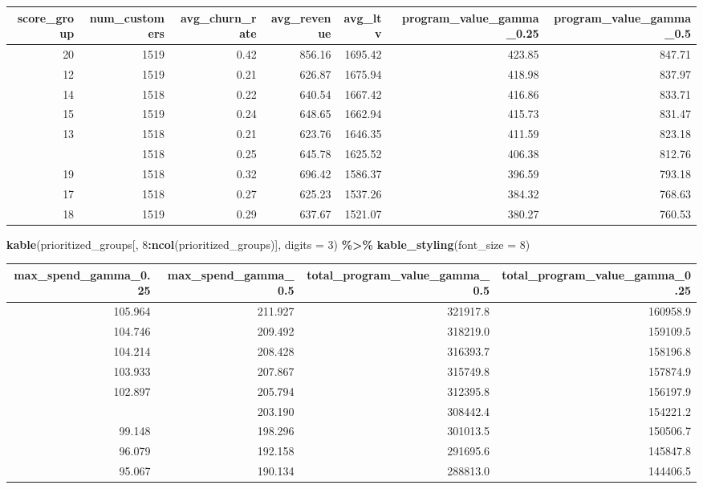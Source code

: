 \documentclass[
]{article}
\newenvironment{Shaded}{\begin{snugshade}}{\end{snugshade}}
\newcommand{\AttributeTok}[1]{\textcolor[rgb]{0.13,0.29,0.53}{#1}}
\newcommand{\DecValTok}[1]{\textcolor[rgb]{0.00,0.00,0.81}{#1}}
\newcommand{\FunctionTok}[1]{\textcolor[rgb]{0.13,0.29,0.53}{\textbf{#1}}}
\newcommand{\NormalTok}[1]{#1}
\newcommand{\SpecialCharTok}[1]{\textcolor[rgb]{0.81,0.36,0.00}{\textbf{#1}}}
\begin{document}
\begingroup\fontsize{8}{10}\selectfont

\begin{longtable}[t]{rrrrrrr}
\toprule
score\_group & num\_customers & avg\_churn\_rate & avg\_revenue & avg\_ltv & program\_value\_gamma\_0.25 & program\_value\_gamma\_0.5\\
\midrule
20 & 1519 & 0.42 & 856.16 & 1695.42 & 423.85 & 847.71\\
12 & 1519 & 0.21 & 626.87 & 1675.94 & 418.98 & 837.97\\
14 & 1518 & 0.22 & 640.54 & 1667.42 & 416.86 & 833.71\\
15 & 1519 & 0.24 & 648.65 & 1662.94 & 415.73 & 831.47\\
13 & 1518 & 0.21 & 623.76 & 1646.35 & 411.59 & 823.18\\
\addlinespace
16 & 1518 & 0.25 & 645.78 & 1625.52 & 406.38 & 812.76\\
19 & 1518 & 0.32 & 696.42 & 1586.37 & 396.59 & 793.18\\
17 & 1518 & 0.27 & 625.23 & 1537.26 & 384.32 & 768.63\\
18 & 1519 & 0.29 & 637.67 & 1521.07 & 380.27 & 760.53\\
\bottomrule
\end{longtable}
\endgroup{}

\begin{Shaded}
\begin{Highlighting}[]
\FunctionTok{kable}\NormalTok{(prioritized\_groups[, }\DecValTok{8}\SpecialCharTok{:}\FunctionTok{ncol}\NormalTok{(prioritized\_groups)], }\AttributeTok{digits =} \DecValTok{3}\NormalTok{) }\SpecialCharTok{\%\textgreater{}\%}
  \FunctionTok{kable\_styling}\NormalTok{(}\AttributeTok{font\_size =} \DecValTok{8}\NormalTok{)}
\end{Highlighting}
\end{Shaded}

\begingroup\fontsize{8}{10}\selectfont

\begin{longtable}[t]{rrrr}
\toprule
max\_spend\_gamma\_0.25 & max\_spend\_gamma\_0.5 & total\_program\_value\_gamma\_0.5 & total\_program\_value\_gamma\_0.25\\
\midrule
105.964 & 211.927 & 321917.8 & 160958.9\\
104.746 & 209.492 & 318219.0 & 159109.5\\
104.214 & 208.428 & 316393.7 & 158196.8\\
103.933 & 207.867 & 315749.8 & 157874.9\\
102.897 & 205.794 & 312395.8 & 156197.9\\
\addlinespace
101.595 & 203.190 & 308442.4 & 154221.2\\
99.148 & 198.296 & 301013.5 & 150506.7\\
96.079 & 192.158 & 291695.6 & 145847.8\\
95.067 & 190.134 & 288813.0 & 144406.5\\
\bottomrule
\end{longtable}
\endgroup{}
\end{document}
